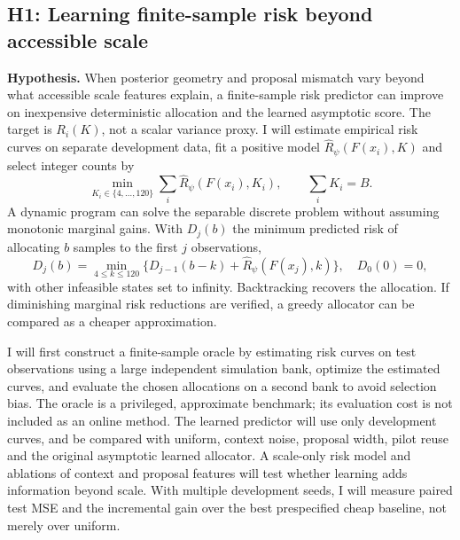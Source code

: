 \documentclass[11pt,letterpaper]{article}
\begin{document}
\subsection{H1: Learning finite-sample risk beyond accessible scale}
\textbf{Hypothesis.} When posterior geometry and proposal mismatch vary beyond what accessible scale features explain, a finite-sample risk predictor can improve on inexpensive deterministic allocation and the learned asymptotic score. The target is $R_i(K)$, not a scalar variance proxy. I will estimate empirical risk curves on separate development data, fit a positive model $\widehat R_\psi(F(x_i),K)$ and select integer counts by
\begin{equation}
 \min_{K_i\in\{4,\ldots,120\}}\sum_i\widehat R_\psi(F(x_i),K_i),\qquad \sum_i K_i=B.
\end{equation}
A dynamic program can solve the separable discrete problem without assuming monotonic marginal gains. With $D_j(b)$ the minimum predicted risk of allocating $b$ samples to the first $j$ observations,
\begin{equation}
 D_j(b)=\min_{4\leq k\leq120}\{D_{j-1}(b-k)+\widehat R_\psi(F(x_j),k)\},\quad D_0(0)=0,
\end{equation}
with other infeasible states set to infinity. Backtracking recovers the allocation. If diminishing marginal risk reductions are verified, a greedy allocator can be compared as a cheaper approximation.

I will first construct a finite-sample oracle by estimating risk curves on test observations using a large independent simulation bank, optimize the estimated curves, and evaluate the chosen allocations on a second bank to avoid selection bias. The oracle is a privileged, approximate benchmark; its evaluation cost is not included as an online method. The learned predictor will use only development curves, and be compared with uniform, context noise, proposal width, pilot reuse and the original asymptotic learned allocator. A scale-only risk model and ablations of context and proposal features will test whether learning adds information beyond scale. With multiple development seeds, I will measure paired test MSE and the incremental gain over the best prespecified cheap baseline, not merely over uniform.
\end{document}
